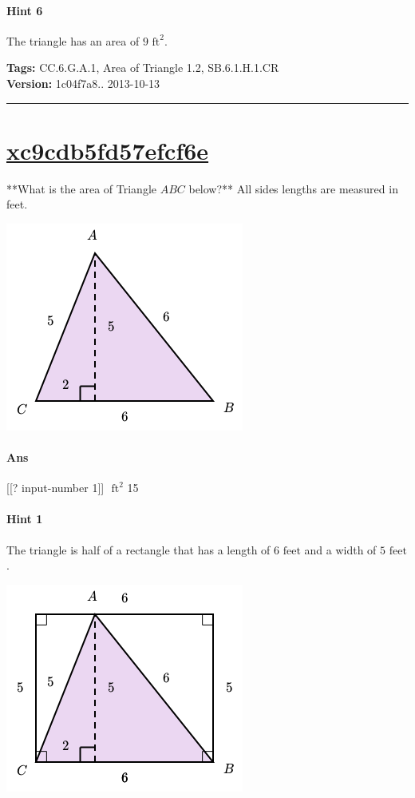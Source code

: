 \documentclass[twocolumn,10pt]{article}
\def\shrinkfactor{0.55}
\begin{document}
\paragraph{Hint 6}The triangle has an area of $9\text { ft}^2$.



\medskip
\noindent
\textbf{Tags:} {\footnotesize CC.6.G.A.1, Area of Triangle 1.2, SB.6.1.H.1.CR}\\
\textbf{Version:} 1c04f7a8.. 2013-10-13
\smallskip\hrule





\section{\href{https://www.khanacademy.org/devadmin/content/items/xc9cdb5fd57efcf6e}{xc9cdb5fd57efcf6e}}

\noindent
**What is the area of Triangle $ABC$ below?**  
All sides lengths are measured in feet.  
 

\includegraphics[scale=\shrinkfactor]{figures/db747f2a0ea18e442f18237430ec439a434782e4.png}

\paragraph{Ans} [[? input-number 1]] $\text { ft}^2$  15

\paragraph{Hint 1}The triangle is half of a rectangle that has a length of $6\text{ feet}$ and a width of $5\text{ feet}$.  


\includegraphics[scale=\shrinkfactor]{figures/86243067a56547580a849393a4e0140c1353e497.png}
\end{document}
